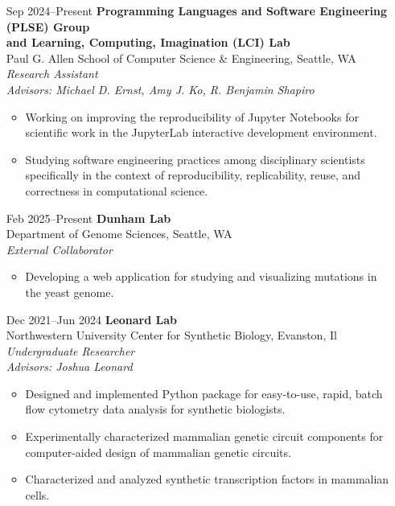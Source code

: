 \documentclass{article}
\begin{document}
\begin{itemize}[leftmargin=1.5in]
    \item[Sep 2024–Present] \textbf{Programming Languages and Software Engineering (PLSE) Group\\and Learning, Computing, Imagination (LCI) Lab}\\
    Paul G. Allen School of Computer Science \& Engineering, Seattle, WA\\
    \textit{Research Assistant}\\
    \textit{Advisors: Michael D. Ernst, Amy J. Ko, R. Benjamin Shapiro}
    \begin{itemize}
        \item Working on improving the reproducibility of Jupyter Notebooks for scientific work in the JupyterLab interactive development environment.
        \item Studying software engineering practices among disciplinary scientists specifically in the context of reproducibility, replicability, reuse, and correctness in computational science.
    \end{itemize}
    \item[Feb 2025–Present] \textbf{Dunham Lab}\\
    Department of Genome Sciences, Seattle, WA\\
    \textit{External Collaborator}
    \begin{itemize}
        \item Developing a web application for studying and visualizing mutations in the yeast genome.
    \end{itemize}
    \item[Dec 2021–Jun 2024] \textbf{Leonard Lab}\\
    Northwestern University Center for Synthetic Biology, Evanston, Il\\
    \textit{Undergraduate Researcher}\\
    \textit{Advisors: Joshua Leonard}
    \begin{itemize}
        \item Designed and implemented Python package for easy-to-use, rapid, batch flow cytometry data analysis for synthetic biologists.
        \item Experimentally characterized mammalian genetic circuit components for computer-aided design of mammalian genetic circuits.
        \item Characterized and analyzed synthetic transcription factors in mammalian cells.
    \end{itemize}

\end{itemize}
\end{document}

